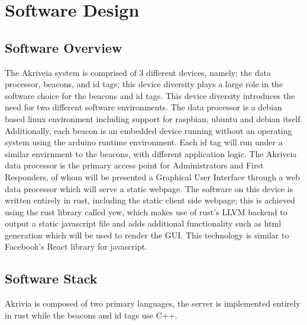 

\setcounter{section}{5}
\section{Software Design}
\bigskip



\subsection{Software Overview}
The Akriveia system is comprised of 3 different devices, namely: the data processor, beacons, and id tags; this device diversity plays a large role in the software choice for the beacons and id tags.
This device diversity introduces the need for two different software environments. The data processor is a debian based linux environment including support for raspbian, ubuntu and debian itself.
Additionally, each beacon is an embedded device running without an operating system using the arduino runtime environment.
Each id tag will run under a similar envirnment to the beacons, with different application logic.
The Akriveia data processor is the primary access point for Administrators and First Responders, of whom will be presented a Graphical User Interface through a web data processor which will serve a static webpage.
The software on this device is written entirely in rust, including the static client side webpage; this is achieved using the rust library called yew, which makes use of rust's LLVM backend to output a static javascript file and adds additional functionality such as html generation which will be used to render the GUI.
This technology is similar to Facebook's React library for javascript.

\bigskip
\subsection{Software Stack}
Akrivia is composed of two primary languages, the server is implemented entirely in rust while the beacons and id tags use C++.

